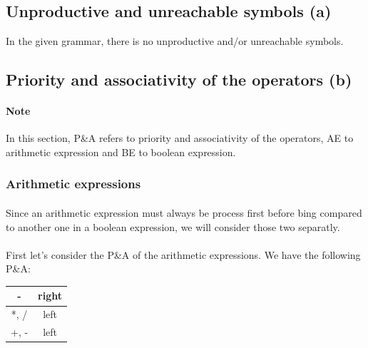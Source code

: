 \documentclass[letterpaper]{article}
\begin{document}
\subsection{Unproductive and unreachable symbols (a)}

In the given grammar, there is no unproductive and/or unreachable symbols.

\subsection{Priority and associativity of the operators (b)}

\paragraph{Note} In this section, P\&A refers to priority and associativity
of the operators, AE to arithmetic expression and BE to boolean expression.

\subsubsection{Arithmetic expressions}

\paragraph{}

Since an arithmetic expression must always be process first before bing compared
to another one in a boolean expression, we will consider those two separatly.

\paragraph{}

First let's consider the P\&A of the arithmetic expressions. We have the
following P\&A:

\begin{tabular}{|c|c|}
    \hline
    - & right \\
    \hline
    *, / & left \\
    \hline
    +, - & left \\
    \hline
\end{tabular}
\end{document}
